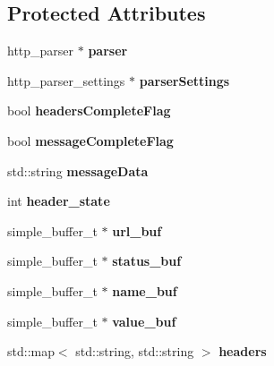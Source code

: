 \subsection*{Protected Attributes}
\begin{DoxyCompactItemize}
\item 
\mbox{\label{class_parser_ad4e7e322f9a17b8339d83186f74a694c}} 
http\+\_\+parser $\ast$ {\bfseries parser}
\item 
\mbox{\label{class_parser_abcf9c5ff429254103942871e829930f5}} 
http\+\_\+parser\+\_\+settings $\ast$ {\bfseries parser\+Settings}
\item 
\mbox{\label{class_parser_aadbd6809527f07a8a54a7d9b2520e9ed}} 
bool {\bfseries headers\+Complete\+Flag}
\item 
\mbox{\label{class_parser_a1caf934e3135f3c608c7a461ade4db8b}} 
bool {\bfseries message\+Complete\+Flag}
\item 
\mbox{\label{class_parser_a1bdfdb9108621ff22ebe8d6a3f297d2d}} 
std\+::string {\bfseries message\+Data}
\item 
\mbox{\label{class_parser_aa111be7074c6a7e23475b18329f31b1d}} 
int {\bfseries header\+\_\+state}
\item 
\mbox{\label{class_parser_a2a07f1e555ffed364d2e8e9db57cd423}} 
simple\+\_\+buffer\+\_\+t $\ast$ {\bfseries url\+\_\+buf}
\item 
\mbox{\label{class_parser_a49632afe07eeaf50e025ec7e3a3066d6}} 
simple\+\_\+buffer\+\_\+t $\ast$ {\bfseries status\+\_\+buf}
\item 
\mbox{\label{class_parser_a9bffeb646e67684de79189570a3d9bd6}} 
simple\+\_\+buffer\+\_\+t $\ast$ {\bfseries name\+\_\+buf}
\item 
\mbox{\label{class_parser_abaf2ea297ca47df80116d24c94acd9a2}} 
simple\+\_\+buffer\+\_\+t $\ast$ {\bfseries value\+\_\+buf}
\item 
\mbox{\label{class_parser_a673a3369ac06cbc967394cdd2c441c90}} 
std\+::map$<$ std\+::string, std\+::string $>$ {\bfseries headers}
\end{DoxyCompactItemize}
